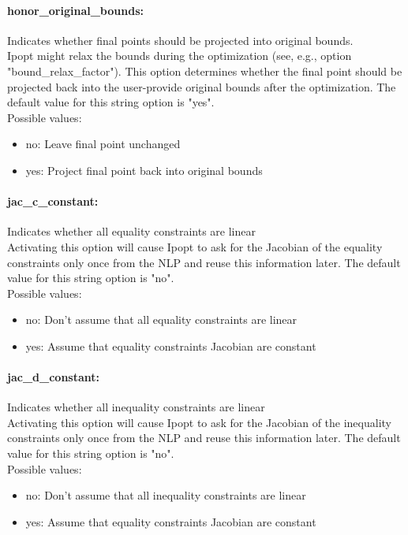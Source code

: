 \paragraph{honor\_original\_bounds:}\label{sec:honor_original_bounds} Indicates whether final points should be projected into original bounds. $\;$ \\
 Ipopt might relax the bounds during the
optimization (see, e.g., option
"bound\_relax\_factor").  This option determines
whether the final point should be projected back
into the user-provide original bounds after the
optimization.
The default value for this string option is "yes".
\\ 
Possible values:
\begin{itemize}
   \item no: Leave final point unchanged
   \item yes: Project final point back into original bounds
\end{itemize}

\paragraph{jac\_c\_constant:}\label{sec:jac_c_constant} Indicates whether all equality constraints are linear $\;$ \\
 Activating this option will cause Ipopt to ask
for the Jacobian of the equality constraints only
once from the NLP and reuse this information
later.
The default value for this string option is "no".
\\ 
Possible values:
\begin{itemize}
   \item no: Don't assume that all equality constraints are
linear
   \item yes: Assume that equality constraints Jacobian are
constant
\end{itemize}

\paragraph{jac\_d\_constant:}\label{sec:jac_d_constant} Indicates whether all inequality constraints are linear $\;$ \\
 Activating this option will cause Ipopt to ask
for the Jacobian of the inequality constraints
only once from the NLP and reuse this information
later.
The default value for this string option is "no".
\\ 
Possible values:
\begin{itemize}
   \item no: Don't assume that all inequality constraints
are linear
   \item yes: Assume that equality constraints Jacobian are
constant
\end{itemize}

